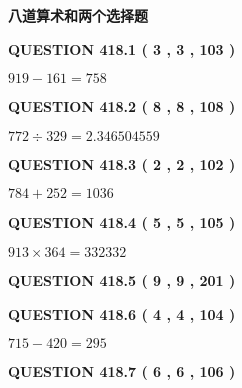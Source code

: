 \documentclass{ctexart}
\begin{document}
   
   
   
 \vspace{0.2in}
{\LARGE {\textbf{ 八道算术和两个选择题}}}
   
   
  
\vspace{0.2in}
  
{\textbf{\Large{QUESTION
418.1 
 ( 3 , 3 , 103 )
}}}
  
  
 
 

$ %
919 -  %
161=   %
758$
 
 
  
\vspace{0.2in}
  
{\textbf{\Large{QUESTION
418.2 
 ( 8 , 8 , 108 )
}}}
  
  
 
 

$ %
772 \div  %
329=   %
2.346504559$
 
 
  
\vspace{0.2in}
  
{\textbf{\Large{QUESTION
418.3 
 ( 2 , 2 , 102 )
}}}
  
  
 
 

$ %
784 +  %
252=   %
1036$
 
 
  
\vspace{0.2in}
  
{\textbf{\Large{QUESTION
418.4 
 ( 5 , 5 , 105 )
}}}
  
  
 
 

$ %
913 \times  %
364=   %
332332$
 
 
  
\vspace{0.2in}
  
{\textbf{\Large{QUESTION
418.5 
 ( 9 , 9 , 201 )
}}}
  
  
  
\vspace{0.2in}
  
{\textbf{\Large{QUESTION
418.6 
 ( 4 , 4 , 104 )
}}}
  
  
 
 

$ %
715 -  %
420=   %
295$
 
 
  
\vspace{0.2in}
  
{\textbf{\Large{QUESTION
418.7 
 ( 6 , 6 , 106 )
}}}
  
\end{document}
